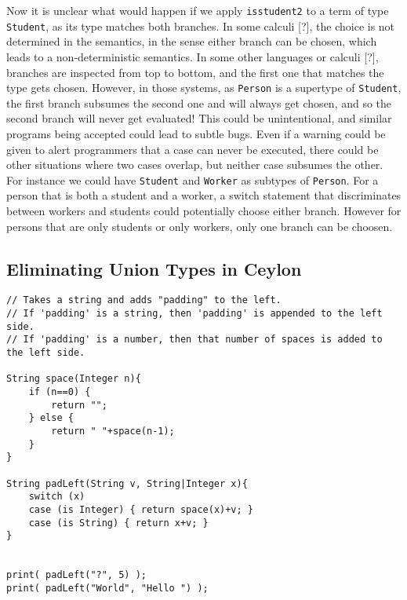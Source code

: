 \noindent Now it is unclear what would happen if we apply \lstinline{isstudent2}
to a term of type \lstinline{Student}, as its type matches both branches. In some
calculi [?], the choice is not determined in the semantics, in the sense either
branch can be chosen, which leads to a non-deterministic semantics. In some
other languages or calculi [?], branches are inspected from top to bottom, and the first one
that matches the type gets chosen. However, in those systems, as
\lstinline{Person} is a supertype of \lstinline{Student}, the first branch
subsumes the second one and will always get chosen, and so the second branch
will never get evaluated! This could be unintentional, and similar programs  
being accepted could lead to subtle bugs. Even if a warning could be given
to alert programmers that a case can never be executed, there could be
other situations where two cases overlap, but neither case subsumes the other.
For instance we could have \lstinline{Student} and \lstinline{Worker} as
subtypes of \lstinline{Person}. For a person that is both a student and a worker,
a switch statement that discriminates between workers and students could
potentially choose either branch. However for persons that are only students
or only workers, only one branch can be choosen.

\subsection{Eliminating Union Types in Ceylon}


\begin{lstlisting}
// Takes a string and adds "padding" to the left.
// If 'padding' is a string, then 'padding' is appended to the left side.
// If 'padding' is a number, then that number of spaces is added to the left side.

String space(Integer n){
	if (n==0) {
		return "";
	} else {
		return " "+space(n-1);
	}
}

String padLeft(String v, String|Integer x){
	switch (x)
	case (is Integer) { return space(x)+v; }
	case (is String) { return x+v; }
}


print( padLeft("?", 5) );
print( padLeft("World", "Hello ") );
\end{lstlisting}

